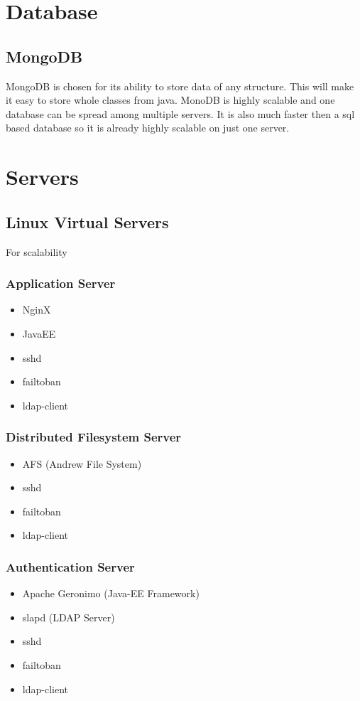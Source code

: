 
\section{Database}
	\subsection{MongoDB}
		MongoDB is chosen for its ability to store data of any structure. This will make it easy to store whole classes from java. MonoDB is highly scalable and one database can be spread among multiple servers. It is also much faster then a sql based database so it is already highly scalable on just one server. 
\section{Servers}
	\subsection{Linux Virtual Servers}
		For scalability
		\subsubsection{Application Server}
		\begin{itemize}
			\item NginX
			\item JavaEE
			\item sshd
			\item failtoban
			\item ldap-client
		\end{itemize}
		\subsubsection{Distributed Filesystem Server}
		\begin{itemize}
			\item AFS (Andrew File System)
			\item sshd
			\item failtoban
			\item ldap-client
		\end{itemize}
		\subsubsection{Authentication Server}
		\begin{itemize}
			\item Apache Geronimo (Java-EE Framework)
			\item slapd (LDAP Server)
			\item sshd
			\item failtoban
			\item ldap-client
		\end{itemize}		
